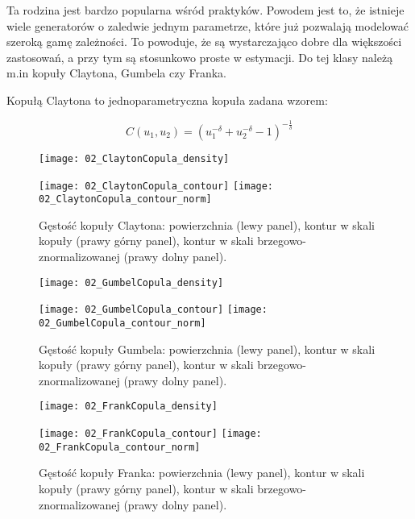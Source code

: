 Ta rodzina jest bardzo popularna wśród praktyków. Powodem jest to, że istnieje wiele generatorów o zaledwie jednym parametrze, które już pozwalają modelować szeroką gamę zależności. To powoduje, że są wystarczająco dobre dla większości zastosowań, a przy tym są stosunkowo proste w estymacji. Do tej klasy należą m.in kopuły Claytona, Gumbela czy Franka.

\begin{df}
	Kopułą Claytona to jednoparametryczna kopuła zadana wzorem:
	
	$$ C(u_1, u_2) = (u_1 ^{-\delta} + u_2^{-\delta} - 1)^{-\frac{1}{\delta}} $$
\end{df}

\begin{figure}[h]
	\centering
	\begin{minipage}{0.5\linewidth}
		\texttt{[image: 02\_ClaytonCopula\_density]}
	\end{minipage}
	\begin{minipage}{0.45\linewidth}
		\texttt{[image: 02\_ClaytonCopula\_contour]}
		\texttt{[image: 02\_ClaytonCopula\_contour\_norm]}
	\end{minipage}
	\caption{Gęstość kopuły Claytona: powierzchnia (lewy panel), kontur w skali kopuły (prawy górny panel), kontur w skali brzegowo-znormalizowanej (prawy dolny panel). \label{fig:clayton_copula_density}}
\end{figure}


\begin{figure}[h]
	\centering
	\begin{minipage}{0.5\linewidth}
		\texttt{[image: 02\_GumbelCopula\_density]}
	\end{minipage}
	\begin{minipage}{0.45\linewidth}
		\texttt{[image: 02\_GumbelCopula\_contour]}
		\texttt{[image: 02\_GumbelCopula\_contour\_norm]}
	\end{minipage}
	\caption{Gęstość kopuły Gumbela: powierzchnia (lewy panel), kontur w skali kopuły (prawy górny panel), kontur w skali brzegowo-znormalizowanej (prawy dolny panel). \label{fig:gumbel_copula_density}}
\end{figure}

\begin{figure}[h]
	\centering
	\begin{minipage}{0.5\linewidth}
		\texttt{[image: 02\_FrankCopula\_density]}
	\end{minipage}
	\begin{minipage}{0.45\linewidth}
		\texttt{[image: 02\_FrankCopula\_contour]}
		\texttt{[image: 02\_FrankCopula\_contour\_norm]}
	\end{minipage}
	\caption{Gęstość kopuły Franka: powierzchnia (lewy panel), kontur w skali kopuły (prawy górny panel), kontur w skali brzegowo-znormalizowanej (prawy dolny panel). \label{fig:frank_copula_density}}
\end{figure}

